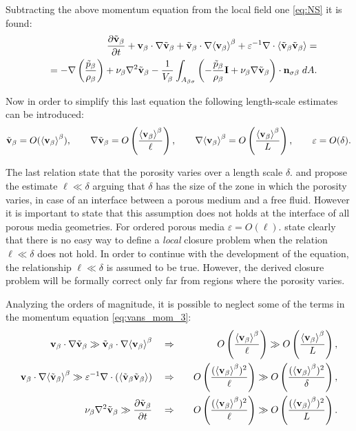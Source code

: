 \noindent Subtracting the above momentum equation from the local field one \eqref{eq:NS} it is found:
\begin{eqnarray}
&&  \dfrac{\partial \tilde{\textbf{v}}_{\beta}}{\partial t} + \textbf{v}_{\beta} \cdot \nabla \tilde{\textbf{v}}_{\beta} + \tilde{\textbf{v}}_{\beta} \cdot \nabla {\left< \textbf{v}_{\beta}\right>}^{\beta} + \varepsilon^{-1}\nabla \cdot  {\left< \tilde{\textbf{v}}_{\beta}\tilde{\textbf{v}}_{\beta}\right>} = \nonumber \\
&&= -\nabla \left(\dfrac{\tilde{p}_{\beta}}{\rho_{\beta}}\right) + \nu_{\beta} \nabla^2 \tilde{\textbf{v}}_{\beta}  - \dfrac{1}{V_\beta} \displaystyle\int_{A_{\beta \sigma}} \left(-\dfrac{\tilde{p}_{\beta}}{\rho_{\beta}} \mathbf{I}  + \nu_{\beta} \nabla \tilde{\textbf{v}}_{\beta} \right) \cdot \mathbf{n}_{\sigma \beta} \;dA.
\label{eq:vans_mom_3}
\end{eqnarray}

Now in order to simplify this last equation the following length-scale estimates can be introduced:
$$ \tilde{\textbf{v}}_{\beta} = O({\left< \textbf{v}_{\beta} \right>}^{\beta}), \qquad \nabla\tilde{\textbf{v}}_{\beta} = O \left(\dfrac{{\left< \textbf{v}_{\beta} \right>}^{\beta}}{\ell} \right), \qquad  \nabla {\left< \textbf{v}_{\beta}\right>}^{\beta} = O\left(\dfrac{{\left< \textbf{v}_{\beta} \right>}^{\beta}}{L}\right), \qquad \varepsilon = O(\delta). $$

The last relation state that the porosity varies over a length scale $\delta$. \citet{valdes2013velocity} and \citet{ochoa1995momentum} propose the estimate $\ell \ll \delta$ arguing that $\delta$ has the size of the zone in which the porosity varies, in case of an interface between a porous medium and a free fluid.
However it is important to state that this assumption does not holds at the interface of all porous media geometries. For ordered porous media $\varepsilon = O(\ell)$.
\citet{whitaker1996forchheimer} state clearly that there is no easy way to define a \textit{local} closure problem when the relation $\ell \ll \delta$ does not hold.
In order to continue with the development of the equation, the relationship $\ell \ll \delta$ is assumed to be true. However, the derived closure problem will be formally correct only far from regions where the porosity varies.

Analyzing the orders of magnitude, it is possible to neglect some of the terms in the momentum equation \eqref{eq:vans_mom_3}:
\begin{eqnarray}
\textbf{v}_{\beta} \cdot \nabla \tilde{\textbf{v}}_{\beta} \gg \tilde{\textbf{v}}_{\beta} \cdot \nabla {\left< \textbf{v}_{\beta}\right>}^{\beta} \quad &\Rightarrow&  \quad O\left(\dfrac{{\left< \textbf{v}_{\beta} \right>}^{\beta}}{\ell}\right) \gg O\left(\dfrac{{\left< \textbf{v}_{\beta} \right>}^{\beta}}{L} \right), \\
\textbf{v}_{\beta} \cdot \nabla {\left< \tilde{\textbf{v}}_{\beta}\right>}^{\beta} \gg  \varepsilon^{-1} \nabla \cdot \left({\left< \tilde{\textbf{v}}_{\beta} \tilde{\textbf{v}}_{\beta} \right>}\right)  \quad &\Rightarrow& \quad O\left(\dfrac{({\left< \textbf{v}_{\beta} \right>}^{\beta})^2}{\ell}\right) \gg O\left(\dfrac{({\left< \textbf{v}_{\beta} \right>}^{\beta})^2}{\delta} \right), \label{eq:sbs}\\
\nu_{\beta} \nabla^2 \tilde{\textbf{v}}_{\beta} \gg  \dfrac{\partial \tilde{\textbf{v}}_{\beta}}{\partial t}  \quad &\Rightarrow&  \quad O\left(\dfrac{({\left< \textbf{v}_{\beta} \right>}^{\beta})^2}{\ell}\right) \gg O\left(\dfrac{({\left< \textbf{v}_{\beta} \right>}^{\beta})^2}{L} \right).
\end{eqnarray}

